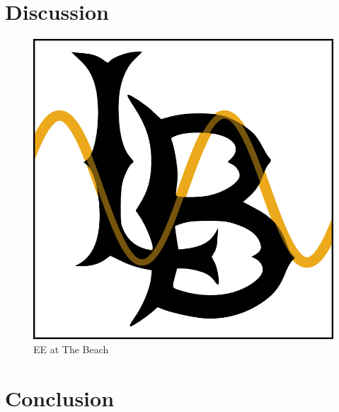 \documentclass{bannerReport}
\begin{document}
	\section{Discussion}
		\lipsum[6]
		\begin{figure}[ht]\centering
			\includegraphics[width=\linewidth]{Assets/EE.png}
			\caption{EE at The Beach}
		\end{figure}
		

	\section{Conclusion}
		\lipsum[7]
\end{document}
